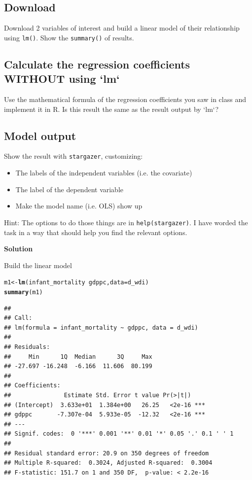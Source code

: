 \documentclass{article}\usepackage[]{graphicx}\usepackage[]{color}
\makeatletter
\newcommand{\hlopt}[1]{\textcolor[rgb]{0,0,0}{#1}}%
\newcommand{\hlstd}[1]{\textcolor[rgb]{0.345,0.345,0.345}{#1}}%
\newcommand{\hlkwb}[1]{\textcolor[rgb]{0.69,0.353,0.396}{#1}}%
\newcommand{\hlkwc}[1]{\textcolor[rgb]{0.333,0.667,0.333}{#1}}%
\newcommand{\hlkwd}[1]{\textcolor[rgb]{0.737,0.353,0.396}{\textbf{#1}}}%
\newenvironment{kframe}{%
 \def\at@end@of@kframe{}%
 \ifinner\ifhmode%
  \def\at@end@of@kframe{\end{minipage}}%
  \begin{minipage}{\columnwidth}%
 \fi\fi%
 \def\FrameCommand##1{\hskip\@totalleftmargin \hskip-\fboxsep
 \colorbox{shadecolor}{##1}\hskip-\fboxsep
     \hskip-\linewidth \hskip-\@totalleftmargin \hskip\columnwidth}%
 \MakeFramed {\advance\hsize-\width
   \@totalleftmargin\z@ \linewidth\hsize
   \@setminipage}}%
 {\par\unskip\endMakeFramed%
 \at@end@of@kframe}
\newenvironment{knitrout}{}{} %
\makeatother
\begin{document}
\subsection{Download}

Download 2 variables of interest and build a linear model of their relationship using \verb`lm()`. Show the \verb`summary()` of results.

\subsection{Calculate the regression coefficients WITHOUT using `lm`}

Use the mathematical formula of the regression coefficients you saw in class and implement it in R. Is this result the same as the result output by `lm`?

\subsection{Model output}

Show the result with \verb`stargazer`, customizing:
\begin{itemize}
\item The labels of the independent variables (i.e. the covariate)
\item The label of the dependent variable
\item Make the model name (i.e. OLS) show up
\end{itemize}

Hint: The options to do those things are in \verb`help(stargazer)`. I have worded the task in a way that should help you find the relevant options.

\textbf{Solution}

Build the linear model

\begin{knitrout}
\color{fgcolor}\begin{kframe}
\begin{alltt}
\hlstd{m1} \hlkwb{<-} \hlkwd{lm}\hlstd{(infant_mortality} \hlopt{~} \hlstd{gdppc,} \hlkwc{data} \hlstd{= d_wdi)}
\hlkwd{summary}\hlstd{(m1)}
\end{alltt}
\begin{verbatim}
## 
## Call:
## lm(formula = infant_mortality ~ gdppc, data = d_wdi)
## 
## Residuals:
##     Min      1Q  Median      3Q     Max 
## -27.697 -16.248  -6.166  11.606  80.199 
## 
## Coefficients:
##               Estimate Std. Error t value Pr(>|t|)    
## (Intercept)  3.633e+01  1.384e+00   26.25   <2e-16 ***
## gdppc       -7.307e-04  5.933e-05  -12.32   <2e-16 ***
## ---
## Signif. codes:  0 '***' 0.001 '**' 0.01 '*' 0.05 '.' 0.1 ' ' 1
## 
## Residual standard error: 20.9 on 350 degrees of freedom
## Multiple R-squared:  0.3024,	Adjusted R-squared:  0.3004 
## F-statistic: 151.7 on 1 and 350 DF,  p-value: < 2.2e-16
\end{verbatim}
\end{kframe}
\end{knitrout}
\end{document}
